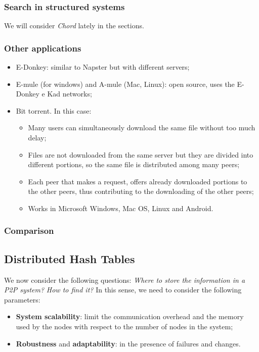 \subsubsection{Search in structured systems}
We will consider \textit{Chord} lately in the sections.

\subsubsection{Other applications}
\begin{itemize}
    \item E-Donkey: similar to Napster but with different servers;
    \item E-mule (for windows) and A-mule (Mac, Linux): open source, uses the E-Donkey e Kad networks;
    \item Bit torrent. In this case:
    \begin{itemize}
        \item Many users can simultaneously download the same file without too much delay;
        \item Files are not downloaded from the same server but they are divided into different portions, so the same file is distributed among many peers;
        \item Each peer that makes a request, offers already downloaded portions to the other peers, thus contributing to the downloading of the other peers;
        \item Works in Microsoft Windows, Mac OS, Linux and Android.
    \end{itemize}
\end{itemize}

\subsubsection{Comparison}


\subsection{Distributed Hash Tables}
We now consider the following questions: \textit{Where to store the information in a P2P system?} \textit{How to find it?} In this sense, we need to consider the following parameters:
\begin{itemize}
    \item \textbf{System scalability}: limit the communication overhead and the memory used by the nodes with respect to the number of nodes in the system;
    \item \textbf{Robustness} and \textbf{adaptability}: in the presence of failures and changes.
\end{itemize}

